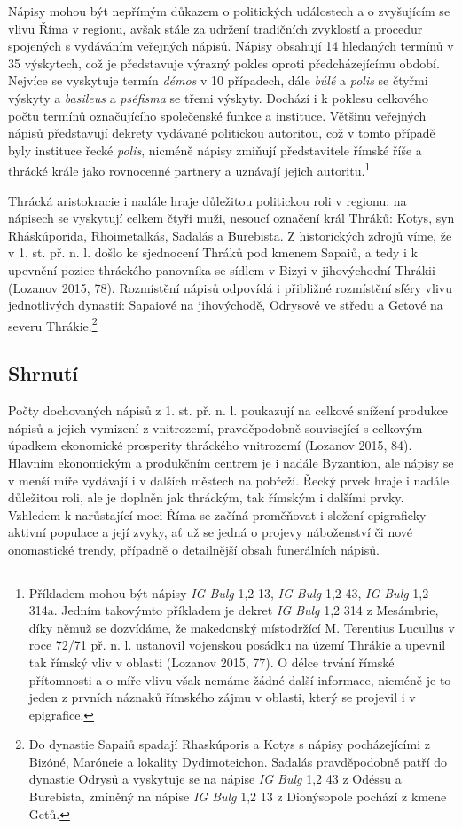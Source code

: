Nápisy mohou být nepřímým důkazem o politických událostech a o zvyšujícím se vlivu Říma v regionu, avšak stále za udržení tradičních zvyklostí a procedur spojených s vydáváním veřejných nápisů. Nápisy obsahují 14 hledaných termínů v 35 výskytech, což je představuje výrazný pokles oproti předcházejícímu období. Nejvíce se vyskytuje termín {\em démos} v 10 případech, dále {\em búlé} a {\em polis} se čtyřmi výskyty a {\em basileus} a {\em pséfisma} se třemi výskyty. Dochází i k poklesu celkového počtu termínů označujícího společenské funkce a instituce. Většinu veřejných nápisů představují dekrety vydávané politickou autoritou, což v tomto případě byly instituce řecké {\em polis}, nicméně nápisy zmiňují představitele římské říše a thrácké krále jako rovnocenné partnery a uznávají jejich autoritu.\footnote{Příkladem mohou být nápisy {\em IG Bulg} 1,2 13, {\em IG Bulg} 1,2 43, {\em IG Bulg} 1,2 314a. Jedním takovýmto příkladem je dekret {\em IG Bulg} 1,2 314 z Mesámbrie, díky němuž se dozvídáme, že makedonský místodržící M. Terentius Lucullus v roce 72/71 př. n. l. ustanovil vojenskou posádku na území Thrákie a upevnil tak římský vliv v oblasti (Lozanov 2015, 77). O délce trvání římské přítomnosti a o míře vlivu však nemáme žádné další informace, nicméně je to jeden z prvních náznaků římského zájmu v oblasti, který se projevil i v epigrafice.}

Thrácká aristokracie i nadále hraje důležitou politickou roli v regionu: na nápisech se vyskytují celkem čtyři muži, nesoucí označení král Thráků: Kotys, syn Rháskúporida, Rhoimetalkás, Sadalás a Burebista. Z historických zdrojů víme, že v 1. st. př. n. l. došlo ke sjednocení Thráků pod kmenem Sapaiů, a tedy i k upevnění pozice thráckého panovníka se sídlem v Bizyi v jihovýchodní Thrákii (Lozanov 2015, 78). Rozmístění nápisů odpovídá i přibližné rozmístění sféry vlivu jednotlivých dynastií: Sapaiové na jihovýchodě, Odrysové ve středu a Getové na severu Thrákie.\footnote{Do dynastie Sapaiů spadají Rhaskúporis a Kotys s nápisy pocházejícími z Bizóné, Maróneie a lokality Dydimoteichon. Sadalás pravděpodobně patří do dynastie Odrysů a vyskytuje se na nápise {\em IG Bulg} 1,2 43 z Odéssu a Burebista, zmíněný na nápise {\em IG Bulg} 1,2 13 z Dionýsopole pochází z kmene Getů.}

\subsection[shrnutí-13]{Shrnutí}

Počty dochovaných nápisů z 1. st. př. n. l. poukazují na celkové snížení produkce nápisů a jejich vymizení z vnitrozemí, pravděpodobně související s celkovým úpadkem ekonomické prosperity thráckého vnitrozemí (Lozanov 2015, 84). Hlavním ekonomickým a produkčním centrem je i nadále Byzantion, ale nápisy se v menší míře vydávají i v dalších městech na pobřeží. Řecký prvek hraje i nadále důležitou roli, ale je doplněn jak thráckým, tak římským i dalšími prvky. Vzhledem k narůstající moci Říma se začíná proměňovat i složení epigraficky aktivní populace a její zvyky, ať už se jedná o projevy náboženství či nové onomastické trendy, případně o detailnější obsah funerálních nápisů.


